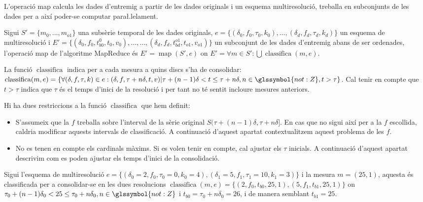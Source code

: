 L'operació map calcula les dades d'entremig a partir de les dades
originals i un esquema multiresolució, treballa en subconjunts de les
dades per a així poder-se computar para\l.lelament.
\begin{definition}
  Sigui $S'=\{m_0,\dotsc,m_{o1}\}$ una subsèrie temporal de les dades
  originals, $e=\{ (\delta_0,f_0,\tau_0,k_0),\ldots,
  (\delta_d,f_d,\tau_d,k_d)\}$ un esquema de multiresolució i
  $E'=\{(\delta_0,f_0, t_{b0}^0, t_0,v_0),\dotsc, \dotsc,
  (\delta_d,f_d, t_{bd}^{o1}, t_{o1},v_{o1}) \}$ un subconjunt de les
  dades d'entremig abans de ser ordenades, l'operació map de
  l'algoritme MapReduce és $E'=\operatorname{map}(S',e)$ on $E'=
  \forall m \in S': \bigcup\operatorname{classifica}(m,e)$.

  La funció $\operatorname{classifica}$ indica per a cada mesura a quins
  discs s'ha de consolidar: $\operatorname{classifica}(m,e)=\{ \forall
  (\delta,f,\tau,k) \in e: (\delta,f,\tau+n\delta,t,v) |
  \tau+(n-1)\delta < t \leq \tau+n\delta, n\in\glssymbol{not:Z}, t >
  \tau \}$. Cal tenir en compte que $t > \tau$ indica que $\tau$ és el temps
  d'inici de la resolució i per tant no té sentit incloure mesures
  anteriors.
\end{definition}






Hi ha dues restriccions a la funció $\operatorname{classifica}$ que
hem definit: 
\begin{itemize}

\item S'assumeix que la $f$ treballa sobre l'interval de la sèrie
  original $S(\tau+(n-1)\delta ,\tau+n\delta]$. En cas que no sigui
  així per a la $f$ escollida, caldria modificar aquests intervals de
  classificació. A continuació d'aquest apartat contextualitzem aquest
  problema de les $f$.

\item No es tenen en compte els cardinals màxims. Si es volen tenir en
  compte, cal ajustar els $\tau$ inicials. A continuació d'aquest
  apartat descrivim com es poden ajustar els temps d'inici de la
  consolidació.

\end{itemize}



\begin{example}
  \label{ex:mapreduce:classifica}
  Sigui l'esquema de multiresolució
  $e=\{(\delta_0=2,f_0,\tau_0=0,k_0=4),(\delta_1=5,f_1,\tau_1=10,k_1=3)\}$
  i la mesura $m=(25,1)$, aquesta és classificada per a consolidar-se
  en les dues resolucions $\operatorname{classifica}(m,e)=\{
  (2,f_0,t_{b0},25,1), (5,f_1,t_{b1},25,1) \}$ on
  $\tau_0+(n-1)\delta_0 < 25 \leq \tau_0+n\delta_0,
  n\in\glssymbol{not:Z}$ i $t_{b0}=\tau_0+n\delta_0 = 26$, i de manera
  semblant $t_{b1}= 25$.
\end{example}





